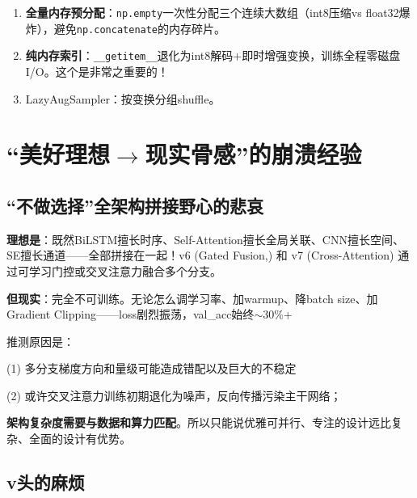 \documentclass{article}
\begin{document}
\begin{enumerate}
  \item \textbf{全量内存预分配}：\texttt{np.empty}一次性分配三个连续大数组（int8压缩vs float32爆炸），避免\texttt{np.concatenate}的内存碎片。
  \item \textbf{纯内存索引}：\texttt{\_\_getitem\_\_}退化为int8解码+即时增强变换，训练全程零磁盘I/O。这个是非常之重要的！
  \item LazyAugSampler：按变换分组shuffle。
\end{enumerate}

\section{``美好理想$\rightarrow$现实骨感''的崩溃经验}

\subsection{``不做选择''全架构拼接野心的悲哀}
\label{sec:fail_fullarch}

\textbf{理想是}：既然BiLSTM擅长时序、Self-Attention擅长全局关联、CNN擅长空间、SE擅长通道——全部拼接在一起！v6 (Gated Fusion,) 和 v7 (Cross-Attention) 通过可学习门控或交叉注意力融合多个分支。

\textbf{但现实}：完全不可训练。无论怎么调学习率、加warmup、降batch size、加Gradient Clipping——loss剧烈振荡，val\_acc始终$\sim$30\%+

推测原因是：

(1) 多分支梯度方向和量级可能造成错配以及巨大的不稳定

(2) 或许交叉注意力训练初期退化为噪声，反向传播污染主干网络；

\textbf{架构复杂度需要与数据和算力匹配}。所以只能说优雅可并行、专注的设计远比复杂、全面的设计有优势。

\subsection{v头的麻烦}
\label{sec:fail_rl}
\end{document}
